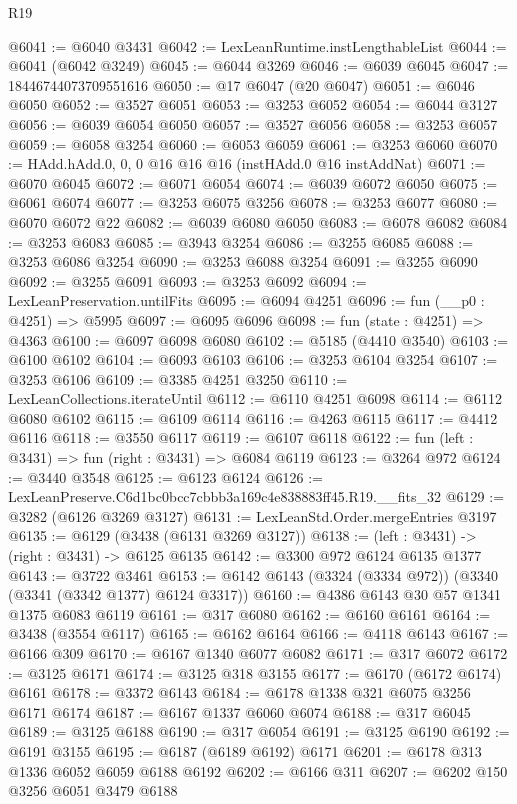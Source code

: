 \begin{lexlean}{R19}
\begin{coremodule}
@6041 := @6040 @3431
@6042 := LexLeanRuntime.instLengthableList
@6044 := @6041 (@6042 @3249)
@6045 := @6044 @3269
@6046 := @6039 @6045
@6047 := 18446744073709551616
@6050 := @17 @6047 (@20 @6047)
@6051 := @6046 @6050
@6052 := @3527 @6051
@6053 := @3253 @6052
@6054 := @6044 @3127
@6056 := @6039 @6054 @6050
@6057 := @3527 @6056
@6058 := @3253 @6057
@6059 := @6058 @3254
@6060 := @6053 @6059
@6061 := @3253 @6060
@6070 := HAdd.hAdd.{0, 0, 0} @16 @16 @16 (instHAdd.{0} @16 instAddNat)
@6071 := @6070 @6045
@6072 := @6071 @6054
@6074 := @6039 @6072 @6050
@6075 := @6061 @6074
@6077 := @3253 @6075 @3256
@6078 := @3253 @6077
@6080 := @6070 @6072 @22
@6082 := @6039 @6080 @6050
@6083 := @6078 @6082
@6084 := @3253 @6083
@6085 := @3943 @3254
@6086 := @3255 @6085
@6088 := @3253 @6086 @3254
@6090 := @3253 @6088 @3254
@6091 := @3255 @6090
@6092 := @3255 @6091
@6093 := @3253 @6092
@6094 := LexLeanPreservation.untilFits
@6095 := @6094 @4251
@6096 := fun (__p0 : @4251) => @5995
@6097 := @6095 @6096
@6098 := fun (state : @4251) => @4363
@6100 := @6097 @6098 @6080
@6102 := @5185 (@4410 @3540)
@6103 := @6100 @6102
@6104 := @6093 @6103
@6106 := @3253 @6104 @3254
@6107 := @3253 @6106
@6109 := @3385 @4251 @3250
@6110 := LexLeanCollections.iterateUntil
@6112 := @6110 @4251 @6098
@6114 := @6112 @6080 @6102
@6115 := @6109 @6114
@6116 := @4263 @6115
@6117 := @4412 @6116
@6118 := @3550 @6117
@6119 := @6107 @6118
@6122 := fun (left : @3431) => fun (right : @3431) => @6084 @6119
@6123 := @3264 @972
@6124 := @3440 @3548
@6125 := @6123 @6124
@6126 := LexLeanPreserve.C6d1bc0bcc7cbbb3a169c4e838883ff45.R19.__fits_32
@6129 := @3282 (@6126 @3269 @3127)
@6131 := LexLeanStd.Order.mergeEntries @3197
@6135 := @6129 (@3438 (@6131 @3269 @3127))
@6138 := (left : @3431) -> (right : @3431) -> @6125 @6135
@6142 := @3300 @972 @6124 @6135 @1377
@6143 := @3722 @3461
@6153 := @6142 @6143 (@3324 (@3334 @972)) (@3340 (@3341 (@3342 @1377) @6124 @3317))
@6160 := @4386 @6143 @30 @57 @1341 @1375 @6083 @6119
@6161 := @317 @6080
@6162 := @6160 @6161
@6164 := @3438 (@3554 @6117)
@6165 := @6162 @6164
@6166 := @4118 @6143
@6167 := @6166 @309
@6170 := @6167 @1340 @6077 @6082
@6171 := @317 @6072
@6172 := @3125 @6171
@6174 := @3125 @318 @3155
@6177 := @6170 (@6172 @6174) @6161
@6178 := @3372 @6143
@6184 := @6178 @1338 @321 @6075 @3256 @6171 @6174
@6187 := @6167 @1337 @6060 @6074
@6188 := @317 @6045
@6189 := @3125 @6188
@6190 := @317 @6054
@6191 := @3125 @6190
@6192 := @6191 @3155
@6195 := @6187 (@6189 @6192) @6171
@6201 := @6178 @313 @1336 @6052 @6059 @6188 @6192
@6202 := @6166 @311
@6207 := @6202 @150 @3256 @6051 @3479 @6188

\end{coremodule}
\end{lexlean}

